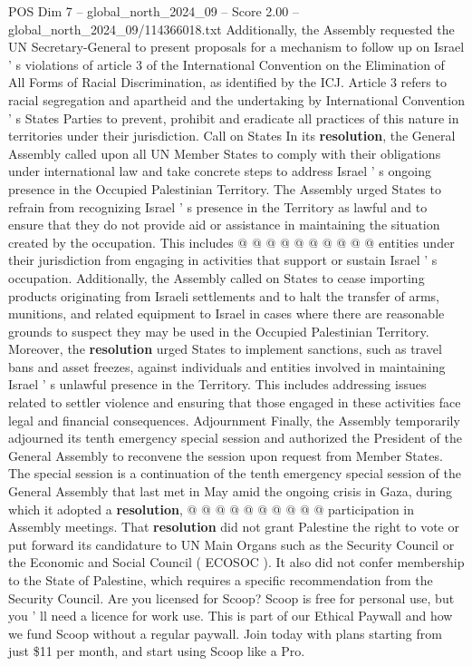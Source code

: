 \begin{textsample}{POS Dim 7 – global\_north\_2024\_09 – Score 2.00 – global\_north\_2024\_09/114366018.txt}
Additionally, the Assembly requested the UN Secretary-General to present proposals for a mechanism to follow up on Israel ' s violations of article 3 of the International Convention on the Elimination of All Forms of Racial Discrimination, as identified by the ICJ.
Article 3 refers to racial segregation and apartheid and the undertaking by International Convention ' s States Parties to prevent, prohibit and eradicate all practices of this nature in territories under their jurisdiction.
Call on States In its \textbf{resolution}, the General Assembly called upon all UN Member States to comply with their obligations under international law and take concrete steps to address Israel ' s ongoing presence in the Occupied Palestinian Territory.
The Assembly urged States to refrain from recognizing Israel ' s presence in the Territory as lawful and to ensure that they do not provide aid or assistance in maintaining the situation created by the occupation.
This includes @ @ @ @ @ @ @ @ @ @ entities under their jurisdiction from engaging in activities that support or sustain Israel ' s occupation.
Additionally, the Assembly called on States to cease importing products originating from Israeli settlements and to halt the transfer of arms, munitions, and related equipment to Israel in cases where there are reasonable grounds to suspect they may be used in the Occupied Palestinian Territory.
Moreover, the \textbf{resolution} urged States to implement sanctions, such as travel bans and asset freezes, against individuals and entities involved in maintaining Israel ' s unlawful presence in the Territory.
This includes addressing issues related to settler violence and ensuring that those engaged in these activities face legal and financial consequences.
Adjournment Finally, the Assembly temporarily adjourned its tenth emergency special session and authorized the President of the General Assembly to reconvene the session upon request from Member States.
The special session is a continuation of the tenth emergency special session of the General Assembly that last met in May amid the ongoing crisis in Gaza, during which it adopted a \textbf{resolution}, @ @ @ @ @ @ @ @ @ @ participation in Assembly meetings.
That \textbf{resolution} did not grant Palestine the right to vote or put forward its candidature to UN Main Organs such as the Security Council or the Economic and Social Council ( ECOSOC ).
It also did not confer membership to the State of Palestine, which requires a specific recommendation from the Security Council.
Are you licensed for Scoop?
Scoop is free for personal use, but you ' ll need a licence for work use.
This is part of our Ethical Paywall and how we fund Scoop without a regular paywall.
Join today with plans starting from just \$11 per month, and start using Scoop like a Pro.

\end{textsample}
